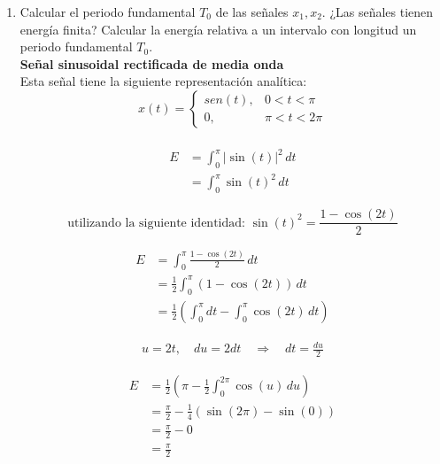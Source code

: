 \documentclass[12pt,a4paper]{report}
\begin{document}
\begin{enumerate}[label=\alph*),left=0pt]
  \item Calcular el periodo fundamental $T_0$ de las señales $x_1, x_2$. ¿Las señales tienen energía finita? Calcular
    la energía relativa a un intervalo con longitud un periodo fundamental $T_0$.\\
	\textbf{Señal sinusoidal rectificada de media onda}
        \\
        Esta señal tiene la siguiente representación analítica:
        $$x(t)=
        \begin{cases}
            sen(t), & 0<t<\pi\\
            0, & \pi<t<2\pi
        \end{cases}
        $$
        \\

    $$
    \begin{aligned}
      E &= \int_{0}^{\pi} |\sin(t)|^2 \, dt \\
        &= \int_{0}^{\pi} \sin(t)^2 \, dt
    \end{aligned}
    $$

    $$
    \text{utilizando la siguiente identidad: }
    \sin(t)^2 = \frac{1 - \cos(2t)}{2}
    $$

    $$
    \begin{aligned}
                      E &= \int_{0}^{\pi} \frac{1 - \cos(2t)}{2} \, dt \\
                        &= \frac{1}{2} \int_{0}^{\pi} (1 - \cos(2t)) \, dt \\
                        &= \frac{1}{2} \left( \int_{0}^{\pi} dt - \int_{0}^{\pi} \cos(2t) \, dt \right)
    \end{aligned}
    $$
    
    
    $$
    \begin{aligned}
      u = 2t, \quad du = 2dt \quad \Rightarrow \quad dt = \frac{du}{2}
    \end{aligned}
    $$
    
    $$
    \begin{aligned}
       E &= \frac{1}{2} \left( \pi - \frac{1}{2} \int_{0}^{2\pi} \cos(u) \, du \right) \\
         &= \frac{\pi}{2} - \frac{1}{4} \left( \sin(2\pi) - \sin(0) \right) \\
         &= \frac{\pi}{2} - 0 \\
         &= \frac{\pi}{2}
    \end{aligned}
    $$
    

\end{enumerate}
\end{document}
